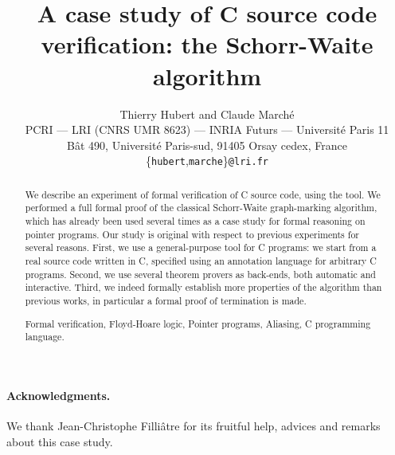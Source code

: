 \documentclass[pagenumbers]{ieee}
\begin{document}
\sloppy

\title{A case study of C source code verification: the Schorr-Waite algorithm}
\author{Thierry Hubert and Claude March\'e \\
PCRI --- LRI (CNRS UMR 8623) --- INRIA Futurs ---
  Universit\'e Paris 11 \\
B\^at 490, Universit\'e Paris-sud, 91405 Orsay cedex, France \\
\{\texttt{hubert},\texttt{marche}\}\texttt{@lri.fr} 
}
\maketitle

\begin{abstract}
  We describe an experiment of formal verification of C source code,
  using the \caduceus{} tool. We performed a full formal proof of the
  classical Schorr-Waite graph-marking algorithm, which has already
  been used several times as a case study for formal reasoning on
  pointer programs. Our study is original with respect to previous
  experiments for several reasons. First, we use a general-purpose
  tool for C programs: we start from a real source code written in
  C, specified using an annotation language for arbitrary C programs.
  Second, we use several theorem provers as back-ends, both automatic
  and interactive.  Third, we indeed formally establish more
  properties of the algorithm than previous works, in particular a
  formal proof of termination is made.

   Formal verification, Floyd-Hoare logic,
  Pointer programs, Aliasing, C programming language.
\end{abstract}








\bigskip
\paragraph{Acknowledgments.} 
We thank Jean-Christophe Filli\^atre for its fruitful help, advices and
remarks about this case study.



\end{document}
